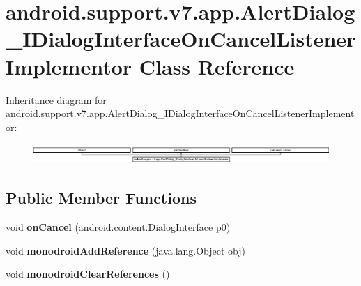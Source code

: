 \hypertarget{classandroid_1_1support_1_1v7_1_1app_1_1AlertDialog__IDialogInterfaceOnCancelListenerImplementor}{}\section{android.\+support.\+v7.\+app.\+Alert\+Dialog\+\_\+\+I\+Dialog\+Interface\+On\+Cancel\+Listener\+Implementor Class Reference}
\label{classandroid_1_1support_1_1v7_1_1app_1_1AlertDialog__IDialogInterfaceOnCancelListenerImplementor}
Inheritance diagram for android.\+support.\+v7.\+app.\+Alert\+Dialog\+\_\+\+I\+Dialog\+Interface\+On\+Cancel\+Listener\+Implementor\+:\begin{figure}[H]
\begin{center}
\leavevmode
\includegraphics[height=0.771350cm]{classandroid_1_1support_1_1v7_1_1app_1_1AlertDialog__IDialogInterfaceOnCancelListenerImplementor}
\end{center}
\end{figure}
\subsection*{Public Member Functions}
\begin{DoxyCompactItemize}
\item 
\mbox{\label{classandroid_1_1support_1_1v7_1_1app_1_1AlertDialog__IDialogInterfaceOnCancelListenerImplementor_ae2ec072b3df6d4e38f2537cf8b7a4978}} 
void {\bfseries on\+Cancel} (android.\+content.\+Dialog\+Interface p0)
\item 
\mbox{\label{classandroid_1_1support_1_1v7_1_1app_1_1AlertDialog__IDialogInterfaceOnCancelListenerImplementor_a3d21bf61ee97426dcae3644ed4fe5be4}} 
void {\bfseries monodroid\+Add\+Reference} (java.\+lang.\+Object obj)
\item 
\mbox{\label{classandroid_1_1support_1_1v7_1_1app_1_1AlertDialog__IDialogInterfaceOnCancelListenerImplementor_a090abc2cc0327da238bc171c57f28c56}} 
void {\bfseries monodroid\+Clear\+References} ()
\end{DoxyCompactItemize}
